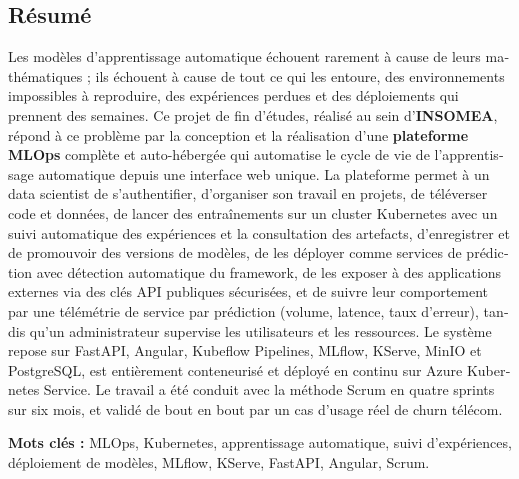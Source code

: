 \vspace{1.2cm}
\begin{otherlanguage}{french}
\section*{R\'esum\'e}

Les mod\`eles d'apprentissage automatique \'echouent rarement \`a cause de leurs
math\'ematiques ; ils \'echouent \`a cause de tout ce qui les entoure, des
environnements impossibles \`a reproduire, des exp\'eriences perdues et des
d\'eploiements qui prennent des semaines. Ce projet de fin d'\'etudes, r\'ealis\'e
au sein d'\textbf{INSOMEA}, r\'epond \`a ce probl\`eme par la conception et la
r\'ealisation d'une \textbf{plateforme MLOps} compl\`ete et auto-h\'eberg\'ee qui
automatise le cycle de vie de l'apprentissage automatique depuis une interface web
unique. La plateforme permet \`a un data scientist de s'authentifier, d'organiser
son travail en projets, de t\'el\'everser code et donn\'ees, de lancer des
entra\^inements sur un cluster Kubernetes avec un suivi automatique des
exp\'eriences et la consultation des artefacts, d'enregistrer et de promouvoir des
versions de mod\`eles, de les d\'eployer comme services de pr\'ediction avec
d\'etection automatique du framework, de les exposer \`a des applications externes
via des cl\'es API publiques s\'ecuris\'ees, et de suivre leur comportement par une
t\'el\'em\'etrie de service par pr\'ediction (volume, latence, taux d'erreur),
tandis qu'un administrateur supervise les utilisateurs et les ressources. Le syst\`eme repose sur FastAPI,
Angular, Kubeflow Pipelines, MLflow, KServe, MinIO et PostgreSQL, est enti\`erement
conteneuris\'e et d\'eploy\'e en continu sur Azure Kubernetes Service. Le travail a
\'et\'e conduit avec la m\'ethode Scrum en quatre sprints sur six mois, et
valid\'e de bout en bout par un cas d'usage r\'eel de churn t\'el\'ecom.

\vspace{0.6cm}
\noindent\textbf{Mots cl\'es :} MLOps, Kubernetes, apprentissage automatique,
suivi d'exp\'eriences, d\'eploiement de mod\`eles, MLflow, KServe, FastAPI,
Angular, Scrum.
\end{otherlanguage}
